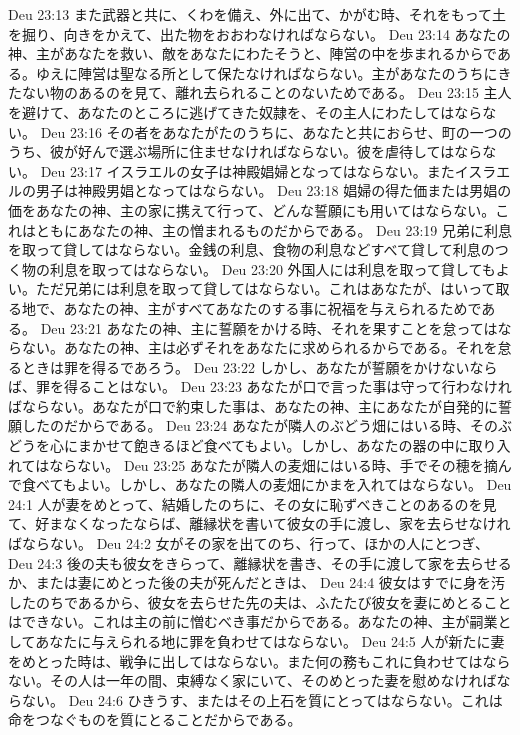 Deu 23:13  また武器と共に、くわを備え、外に出て、かがむ時、それをもって土を掘り、向きをかえて、出た物をおおわなければならない。
Deu 23:14  あなたの神、主があなたを救い、敵をあなたにわたそうと、陣営の中を歩まれるからである。ゆえに陣営は聖なる所として保たなければならない。主があなたのうちにきたない物のあるのを見て、離れ去られることのないためである。
Deu 23:15  主人を避けて、あなたのところに逃げてきた奴隷を、その主人にわたしてはならない。
Deu 23:16  その者をあなたがたのうちに、あなたと共におらせ、町の一つのうち、彼が好んで選ぶ場所に住ませなければならない。彼を虐待してはならない。
Deu 23:17  イスラエルの女子は神殿娼婦となってはならない。またイスラエルの男子は神殿男娼となってはならない。
Deu 23:18  娼婦の得た価または男娼の価をあなたの神、主の家に携えて行って、どんな誓願にも用いてはならない。これはともにあなたの神、主の憎まれるものだからである。
Deu 23:19  兄弟に利息を取って貸してはならない。金銭の利息、食物の利息などすべて貸して利息のつく物の利息を取ってはならない。
Deu 23:20  外国人には利息を取って貸してもよい。ただ兄弟には利息を取って貸してはならない。これはあなたが、はいって取る地で、あなたの神、主がすべてあなたのする事に祝福を与えられるためである。
Deu 23:21  あなたの神、主に誓願をかける時、それを果すことを怠ってはならない。あなたの神、主は必ずそれをあなたに求められるからである。それを怠るときは罪を得るであろう。
Deu 23:22  しかし、あなたが誓願をかけないならば、罪を得ることはない。
Deu 23:23  あなたが口で言った事は守って行わなければならない。あなたが口で約束した事は、あなたの神、主にあなたが自発的に誓願したのだからである。
Deu 23:24  あなたが隣人のぶどう畑にはいる時、そのぶどうを心にまかせて飽きるほど食べてもよい。しかし、あなたの器の中に取り入れてはならない。
Deu 23:25  あなたが隣人の麦畑にはいる時、手でその穂を摘んで食べてもよい。しかし、あなたの隣人の麦畑にかまを入れてはならない。
Deu 24:1  人が妻をめとって、結婚したのちに、その女に恥ずべきことのあるのを見て、好まなくなったならば、離縁状を書いて彼女の手に渡し、家を去らせなければならない。
Deu 24:2  女がその家を出てのち、行って、ほかの人にとつぎ、
Deu 24:3  後の夫も彼女をきらって、離縁状を書き、その手に渡して家を去らせるか、または妻にめとった後の夫が死んだときは、
Deu 24:4  彼女はすでに身を汚したのちであるから、彼女を去らせた先の夫は、ふたたび彼女を妻にめとることはできない。これは主の前に憎むべき事だからである。あなたの神、主が嗣業としてあなたに与えられる地に罪を負わせてはならない。
Deu 24:5  人が新たに妻をめとった時は、戦争に出してはならない。また何の務もこれに負わせてはならない。その人は一年の間、束縛なく家にいて、そのめとった妻を慰めなければならない。
Deu 24:6  ひきうす、またはその上石を質にとってはならない。これは命をつなぐものを質にとることだからである。
